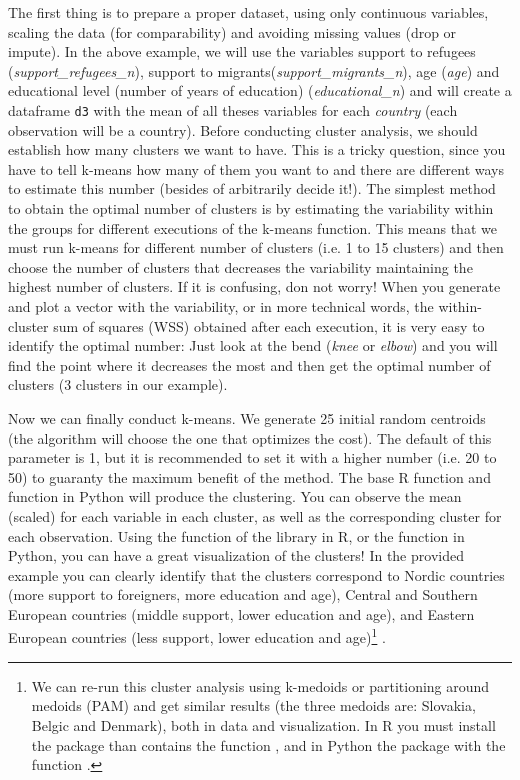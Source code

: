 The first thing is to prepare a proper dataset, using only continuous variables, scaling the data (for comparability) and avoiding missing values (drop or impute). In the above example, we will use the variables support to refugees (\emph{support\_refugees\_n}), support to migrants(\emph{support\_migrants\_n}), age (\emph{age}) and educational level (number of years of education) (\emph{educational\_n}) and will create a dataframe \verb+d3+ with the mean of all theses variables for each \emph{country} (each observation will be a country). Before conducting cluster analysis, we should establish how many clusters we want to have. This is a tricky question, since you have to tell k-means how many of them you want to and there are different ways to estimate this number (besides of arbitrarily decide it!). The simplest method to obtain the optimal number of clusters is by estimating the variability within the groups for different executions of the k-means function. This means that we must run k-means for different number of clusters (i.e. 1 to 15 clusters) and then choose the number of clusters that decreases the variability maintaining the highest number of clusters. If it is confusing, don not worry!  When you generate and plot a vector with the variability, or in more technical words, the within-cluster sum of squares (WSS) obtained after each execution, it is very easy to identify the optimal number: Just look at the bend (\textit{knee} or \textit{elbow}) and you will find the point where it decreases the most and then get the optimal number of clusters (3 clusters in our example).


Now we can finally conduct k-means. We generate 25 initial random centroids (the algorithm will choose the one that optimizes the cost). The default of this parameter is 1, but it is recommended to set it with a higher number (i.e. 20 to 50) to guaranty the maximum benefit of the method. The base R function  and  function  in Python will produce the clustering. You can observe the mean (scaled) for each variable in each cluster, as well as the corresponding cluster for each observation. Using the function  of the library  in R, or the  function  in Python, you can have a great visualization of the clusters! In the provided example you can clearly identify that the clusters correspond to Nordic countries (more support to foreigners, more education and age), Central and Southern European countries (middle support, lower education and age), and Eastern European countries (less support, lower education and age)\footnote{We can re-run this cluster analysis using k-medoids or partitioning around medoids (PAM) and get similar results (the three medoids are: Slovakia, Belgic and Denmark), both in data and visualization. In R you must install the package  than contains the function , and in Python the package  with the function .} .

